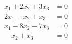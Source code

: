 \begin{align*}
x_1 + 2x_2 + 3x_3 &= 0\\
2x_1 - x_2 + x_3 &= 0\\
x_1 - 8x_2 - 7x_3 &= 0\\
\quad x_2 + x_3 &= 0
\end{align*}